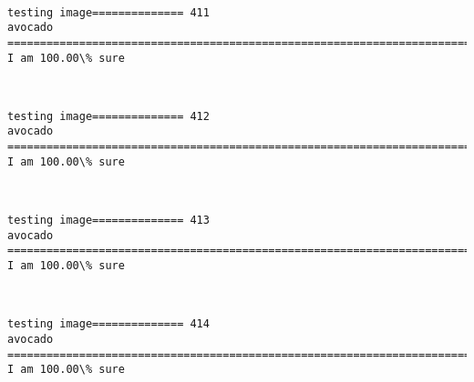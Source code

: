 \documentclass[11pt]{article}
\begin{document}
    \begin{center}
    \end{center}
    { \hspace*{\fill} \\}
    
    \begin{Verbatim}[commandchars=\\\{\}]
testing image============== 411
avocado
============================================================================
I am 100.00\% sure

    \end{Verbatim}

    \begin{center}
    \end{center}
    { \hspace*{\fill} \\}
    
    \begin{Verbatim}[commandchars=\\\{\}]
testing image============== 412
avocado
============================================================================
I am 100.00\% sure

    \end{Verbatim}

    \begin{center}
    \end{center}
    { \hspace*{\fill} \\}
    
    \begin{Verbatim}[commandchars=\\\{\}]
testing image============== 413
avocado
============================================================================
I am 100.00\% sure

    \end{Verbatim}

    \begin{center}
    \end{center}
    { \hspace*{\fill} \\}
    
    \begin{Verbatim}[commandchars=\\\{\}]
testing image============== 414
avocado
============================================================================
I am 100.00\% sure

    \end{Verbatim}
\end{document}
